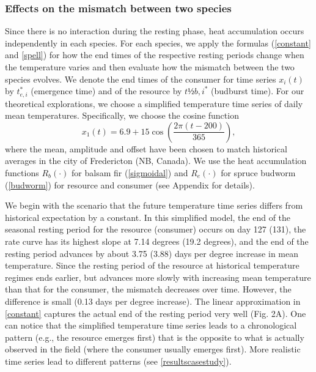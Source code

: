\documentclass[12 pt]{article}
\begin{document}
\subsubsection{Effects on the mismatch between two species}
Since there is no interaction during the resting phase, heat accumulation occurs independently in each species. For each species, we apply the formulas (\ref{constant} and \ref{spell}) for how the end times of the respective resting periods change when the temperature varies and then evaluate how the mismatch between the two species evolves. We denote the end times of the consumer for time series $x_i(t)$ by $t_{e,i}^*$ (emergence time) and of the resource by $t½{b,i}^*$ (budburst time). For our theoretical explorations, we choose a simplified temperature time series of daily mean temperatures. Specifically, we choose the cosine function
\begin{equation}
    x_1(t) = 6.9 + 15 \cos\left(\frac{2\pi (t-200)}{365}\right), \tag{Eq. \theequation}
\end{equation}
where the mean, amplitude and offset have been chosen to match historical averages in the city of Fredericton (NB, Canada). We use the heat accumulation functions $R_b(\cdot)$ for balsam fir (\ref{sigmoidal}) and $R_e(\cdot)$ for spruce budworm (\ref{budworm}) for resource and consumer (see Appendix for details). \par
We begin with the scenario that the future temperature time series differs from historical expectation by a constant. In this simplified model, the end of the seasonal resting period for the resource (consumer) occurs on day 127 (131), the rate curve has its highest slope at 7.14 degrees (19.2 degrees), and the end of the resting period advances by about 3.75 (3.88) days per degree increase in mean temperature. Since the resting period of the resource at historical temperature regimes ends earlier, but advances more slowly with increasing mean temperature than that for the consumer, the mismatch decreases over time.  However, the difference is small (0.13 days per degree increase). The linear approximation in \ref{constant} captures the actual end of the resting period very well (Fig. 2A). One can notice that the simplified temperature time series leads to a chronological pattern (e.g., the resource emerges first) that is the opposite to what is actually observed in the field (where the consumer usually emerges first). More realistic time series lead to different patterns (see \ref{resultscasestudy}).\par
\end{document}
